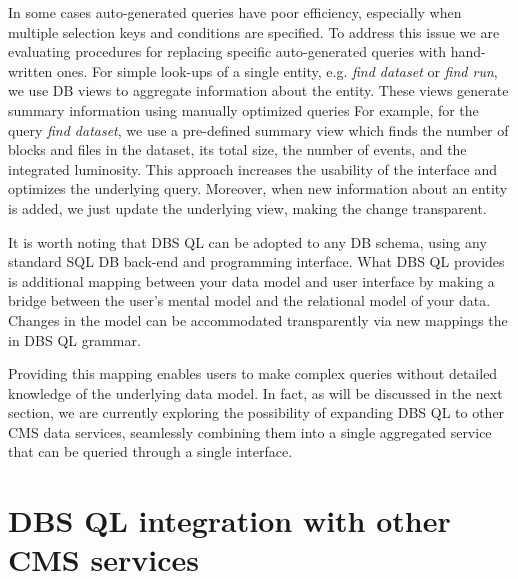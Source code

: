 \documentclass[a4paper]{jpconf}
\begin{document}
In some cases auto-generated queries have poor efficiency, especially
when multiple selection keys and conditions are specified. To address this
issue we are evaluating procedures for replacing specific auto-generated queries with
hand-written ones.  For simple look-ups of a single entity, e.g. {\it find dataset}
or {\it find run}, we use DB views to aggregate information
about the entity.  These views generate summary information using manually optimized queries
For example, for the query {\it find dataset},
we use a pre-defined summary view which finds the number of blocks and
files in the dataset, its total size, the number of events, and the integrated luminosity. 
This approach increases the usability of the interface and optimizes the underlying
query. Moreover, when new information about an entity is added,
we just update the underlying view, making the change transparent.

It is worth noting that DBS QL can be adopted to
any DB schema, using any standard SQL DB back-end and programming interface.
What DBS QL provides is additional mapping between your data model and
user interface by making a bridge between the user's mental model
and the relational model of your data. 
Changes in the model can be accommodated
transparently via new mappings the in DBS QL grammar.

Providing this mapping enables
users to make complex queries without detailed knowledge of
the underlying data model. 
In fact, as will be discussed in the
next section, we are currently exploring the possibility of
expanding DBS QL to other CMS data services, seamlessly combining them
into a single aggregated service that can be queried through a single interface.


\section{DBS QL integration with other CMS services}
\end{document}
